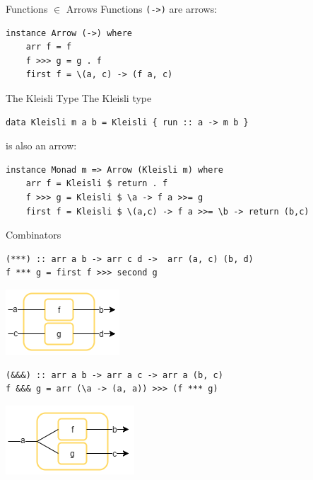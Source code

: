 \begin{frame}[fragile]{Functions $\in$ Arrows}
Functions \lstinline{(->)} are arrows:
\begin{lstlisting}[frame=htrbl]
instance Arrow (->) where
	arr f = f
	f >>> g = g . f
	first f = \(a, c) -> (f a, c)
\end{lstlisting}
\end{frame}

\begin{frame}[fragile]{The Kleisli Type}
The Kleisli type
\begin{lstlisting}[frame=htrbl]
data Kleisli m a b = Kleisli { run :: a -> m b }
\end{lstlisting}
is also an arrow:
\begin{lstlisting}[frame=htrbl]
instance Monad m => Arrow (Kleisli m) where
	arr f = Kleisli $ return . f
	f >>> g = Kleisli $ \a -> f a >>= g
	first f = Kleisli $ \(a,c) -> f a >>= \b -> return (b,c)
\end{lstlisting}
\end{frame}

\begin{frame}[fragile]{Combinators}
\begin{lstlisting}[frame=htrbl]
(***) :: arr a b -> arr c d ->	arr (a, c) (b, d)
f *** g = first f >>> second g
\end{lstlisting}
\begin{center}
	\includegraphics[scale=0.6]{images/starstarstar}
\end{center}
\begin{lstlisting}[frame=htrbl]
(&&&) :: arr a b -> arr a c -> arr a (b, c)
f &&& g = arr (\a -> (a, a)) >>> (f *** g)
\end{lstlisting}
\begin{center}
	\includegraphics[scale=0.6]{images/dollardollardollar}
\end{center}
\end{frame}


